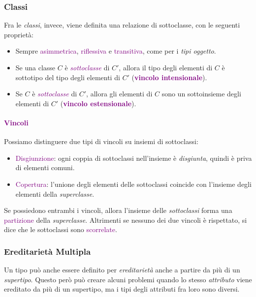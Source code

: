 \subsubsection{Classi}

Fra le \emph{classi}, invece, viene definita una relazione di sottoclasse, con le seguenti proprietà:
\begin{itemize}
    \item Sempre \textcolor{purple}{asimmetrica}, \textcolor{purple}{riflessiva} e
        \textcolor{purple}{transitiva}, come per i \emph{tipi oggetto}.
    \item Se una classe $C$ è \emph{\textcolor{purple}{sottoclasse}} di $C'$, allora il tipo degli elementi di
        $C$ è sottotipo del tipo degli elementi di $C'$ (\textbf{\textcolor{purple}{vincolo intensionale}}).
    \item Se $C$ è \emph{\textcolor{purple}{sottoclasse}} di $C'$, allora gli elementi di $C$ sono un sottoinsieme
        degli elementi di $C'$ (\textbf{\textcolor{purple}{vincolo estensionale}}).
\end{itemize}

\paragraph{\textcolor{purple}{Vincoli}} Possiamo distinguere due tipi di vincoli su insiemi di sottoclassi:
\begin{itemize}
    \item \textcolor{purple}{Disgiunzione}: ogni coppia di sottoclassi nell'insieme è \emph{disgiunta}, quindi è priva di elementi comuni.
    \item \textcolor{purple}{Copertura}: l'unione degli elementi delle sottoclassi coincide con l'insieme degli elementi della \emph{superclasse}.
\end{itemize}

Se possiedono entrambi i vincoli, allora l'insieme delle \emph{sottoclassi} forma una \textcolor{purple}{partizione} della \emph{superclasse}. Altrimenti se nessuno
dei due vincoli è rispettato, si dice che le sottoclassi sono \textcolor{purple}{scorrelate}.

\subsubsection{Ereditarietà Multipla}

Un tipo può anche essere definito per \emph{ereditarietà} anche a partire da più di un
\emph{supertipo}. Questo però può creare alcuni problemi quando lo stesso \emph{attributo} viene ereditato
da più di un supertipo, ma i tipi degli attributi fra loro sono diversi.